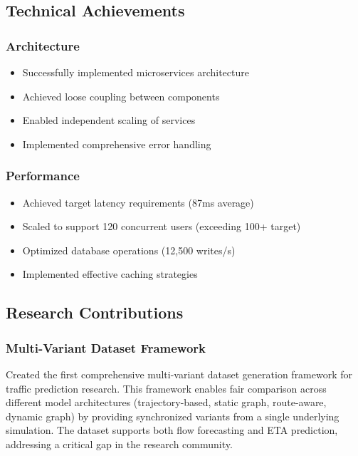 \subsection{Technical Achievements}

\subsubsection{Architecture}
\begin{itemize}
    \item Successfully implemented microservices architecture
    \item Achieved loose coupling between components
    \item Enabled independent scaling of services
    \item Implemented comprehensive error handling
\end{itemize}

\subsubsection{Performance}
\begin{itemize}
    \item Achieved target latency requirements (87ms average)
    \item Scaled to support 120 concurrent users (exceeding 100+ target)
    \item Optimized database operations (12,500 writes/s)
    \item Implemented effective caching strategies
\end{itemize}

\subsection{Research Contributions}

\subsubsection{Multi-Variant Dataset Framework}
Created the first comprehensive multi-variant dataset generation framework for traffic prediction research. This framework enables fair comparison across different model architectures (trajectory-based, static graph, route-aware, dynamic graph) by providing synchronized variants from a single underlying simulation. The dataset supports both flow forecasting and ETA prediction, addressing a critical gap in the research community.

